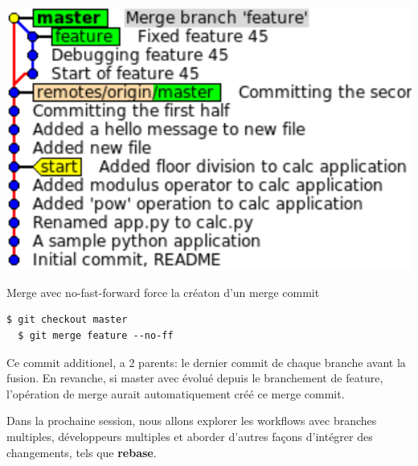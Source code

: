 \documentclass{../../common/tufte-latex/tufte-handout}
\begin{document}
\begin{marginfigure}%
  \centering
  \includegraphics[width=\linewidth]{gitmerge-noff.pdf}
  \label{fig:gitmerge-noff}
  \caption{Merge avec no-fast-forward force la créaton d'un merge commit}
\end{marginfigure}

\begin{lstlisting}[style=BashInputStyle]
  $ git checkout master
  $ git merge feature --no-ff
\end{lstlisting}

Ce commit additionel, a 2 parents: le dernier commit de chaque branche avant la fusion.
En revanche, si master avec évolué depuis le branchement de feature, l'opération de merge aurait automatiquement créé ce merge commit.

Dans la prochaine session, nous allons explorer les workflows avec branches multiples, développeurs multiples et aborder d'autres façons d'intégrer des changements, tels que \textbf{rebase}.



\end{document}
